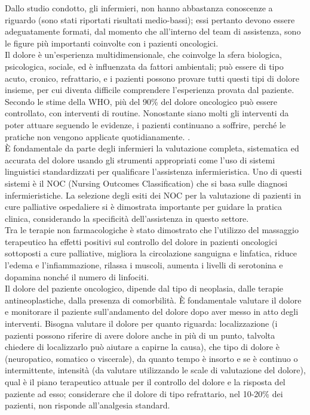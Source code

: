 Dallo studio condotto, gli infermieri, non hanno abbastanza conoscenze a riguardo (sono stati riportati risultati 
medio-bassi); essi pertanto devono essere adeguatamente formati, dal momento che all’interno del team di 
assistenza, sono le figure più importanti coinvolte con i pazienti oncologici\cite{PAIN}.\\
Il dolore è un’esperienza multidimensionale, che coinvolge la sfera biologica, psicologica, sociale, ed è 
influenzata da fattori ambientali; può essere di tipo acuto, cronico, refrattario, e i pazienti possono 
provare tutti questi tipi di dolore insieme, per cui diventa difficile comprendere l’esperienza provata dal 
paziente.\\ Secondo le stime  della WHO, più del 90\% del dolore oncologico può essere controllato, 
con interventi di routine. Nonostante siano molti gli interventi da poter attuare seguendo le evidenze, 
i pazienti continuano a soffrire, perché le pratiche non vengono applicate quotidianamente.
\cite{PAINONS}.\\
È fondamentale da parte degli infermieri la valutazione completa, sistematica ed accurata del dolore usando 
gli strumenti appropriati come l'uso di sistemi linguistici standardizzati per qualificare l’assistenza infermieristica. 
Uno di questi sistemi è il NOC (Nursing Outcomes Classification) che si basa sulle diagnosi infermieristiche. 
La selezione degli esiti dei NOC per la valutazione di pazienti in cure palliative ospedaliere si è dimostrata 
importante per guidare la pratica clinica, considerando la specificità dell’assistenza in questo settore\cite{painNOC}.\\
Tra le terapie non farmacologiche è stato dimostrato che l’utilizzo del massaggio terapeutico ha effetti positivi sul 
controllo del dolore in pazienti oncologici sottoposti a cure palliative, migliora la circolazione sanguigna e linfatica, 
riduce l’edema e l’infiammazione, rilassa i muscoli, aumenta i livelli di 
serotonina e dopamina nonché il numero di linfociti\cite{tpnonfarmacologiche}.\\

Il dolore del paziente oncologico, dipende dal tipo di neoplasia, dalle terapie antineoplastiche, 
dalla presenza di comorbilità. È fondamentale valutare il dolore e monitorare il paziente sull’andamento 
del dolore dopo aver messo in atto degli interventi. Bisogna valutare il dolore per quanto riguarda: 
localizzazione (i pazienti possono riferire di avere dolore anche in più di un punto, talvolta chiedere di 
localizzarlo può aiutare a capirne la causa), che tipo di dolore è (neuropatico, somatico o viscerale), 
da quanto tempo è insorto e se è continuo o intermittente, intensità (da valutare utilizzando le scale 
di valutazione del dolore), qual è il piano terapeutico attuale per il controllo del dolore e la risposta 
del paziente ad esso; considerare che il dolore di tipo refrattario, nel 10-20\% dei pazienti, 
non risponde all’analgesia standard\cite{CANCERPAINONS}.\\

